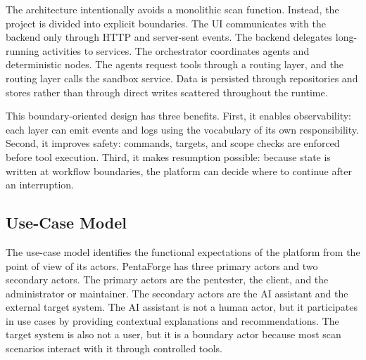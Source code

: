 \documentclass[12pt,a4paper]{report}
\begin{document}
The architecture intentionally avoids a monolithic scan function. Instead, the project
is divided into explicit boundaries. The UI communicates with the backend only through
HTTP and server-sent events. The backend delegates long-running activities to services.
The orchestrator coordinates agents and deterministic nodes. The agents request tools
through a routing layer, and the routing layer calls the sandbox service. Data is
persisted through repositories and stores rather than through direct writes scattered
throughout the runtime.

This boundary-oriented design has three benefits. First, it enables observability:
each layer can emit events and logs using the vocabulary of its own responsibility.
Second, it improves safety: commands, targets, and scope checks are enforced before
tool execution. Third, it makes resumption possible: because state is written at
workflow boundaries, the platform can decide where to continue after an interruption.

\subsection{Use-Case Model}

The use-case model identifies the functional expectations of the platform from the
point of view of its actors. PentaForge has three primary actors and two secondary
actors. The primary actors are the pentester, the client, and the administrator or
maintainer. The secondary actors are the AI assistant and the external target system.
The AI assistant is not a human actor, but it participates in use cases by providing
contextual explanations and recommendations. The target system is also not a user, but
it is a boundary actor because most scan scenarios interact with it through controlled
tools.
\end{document}
